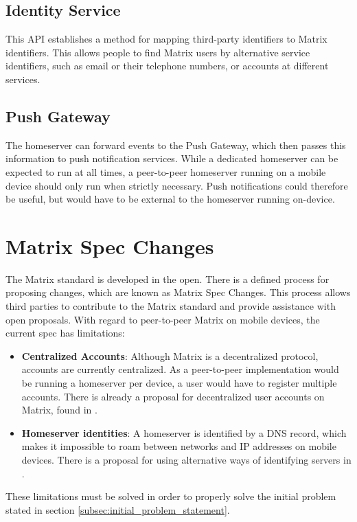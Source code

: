 \subsection{Identity Service}
This \ac{API} establishes a method for mapping third-party identifiers to Matrix identifiers.
This allows people to find Matrix users by alternative service identifiers, such as email or their telephone numbers, or accounts at different services.

\subsection{Push Gateway}
The homeserver can forward events to the Push Gateway, which then passes this information to push notification services.
While a dedicated homeserver can be expected to run at all times, a peer-to-peer homeserver running on a mobile device should only run when strictly necessary.
Push notifications could therefore be useful, but would have to be external to the homeserver running on-device.


\section{Matrix Spec Changes}
The Matrix standard is developed in the open.
There is a defined process for proposing changes, which are known as Matrix Spec Changes\cite{matrix_org_spec_changes}.
This process allows third parties to contribute to the Matrix standard and provide assistance with open proposals.
With regard to peer-to-peer Matrix on mobile devices, the current spec has limitations:
\begin{itemize}
    \item{
        \textbf{Centralized Accounts}: 
        Although Matrix is a decentralized protocol, accounts are currently centralized.
        As a peer-to-peer implementation would be running a homeserver per device, a user would have to register multiple accounts.
        There is already a proposal for decentralized user accounts on Matrix, found in \cite{matrix_msc_??}.
    }
    \item{
        \textbf{Homeserver identities}:
        A homeserver is identified by a DNS record, which makes it impossible to roam between networks and IP addresses on mobile devices.
        There is a proposal for using alternative ways of identifying servers in \cite{matrix_msc_??}.
    }
\end{itemize}
These limitations must be solved in order to properly solve the initial problem stated in section \ref{subsec:initial_problem_statement}.


